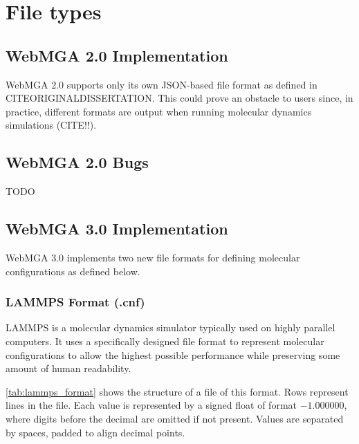 \section{File types}
\subsection{WebMGA 2.0 Implementation}
WebMGA 2.0 supports only its own JSON-based file format as defined in CITEORIGINALDISSERTATION. This could prove an obstacle to users since, in practice, different formats are output when running molecular dynamics simulations (CITE!!).

\subsection{WebMGA 2.0 Bugs}
TODO

\subsection{WebMGA 3.0 Implementation}
WebMGA 3.0 implements two new file formats for defining molecular configurations as defined below.
\subsubsection{LAMMPS Format (.cnf)}
LAMMPS is a molecular dynamics simulator typically used on highly parallel computers\cite{thompson2022lammps}. It uses a specifically designed file format to represent molecular configurations to allow the highest possible performance while preserving some amount of human readability.

\cref{tab:lammps_format} shows the structure of a file of this format. Rows represent lines in the file. Each value is represented by a signed float of format $-1.000000 $, where digits before the decimal are omitted if not present. Values are separated by spaces, padded to align decimal points.

